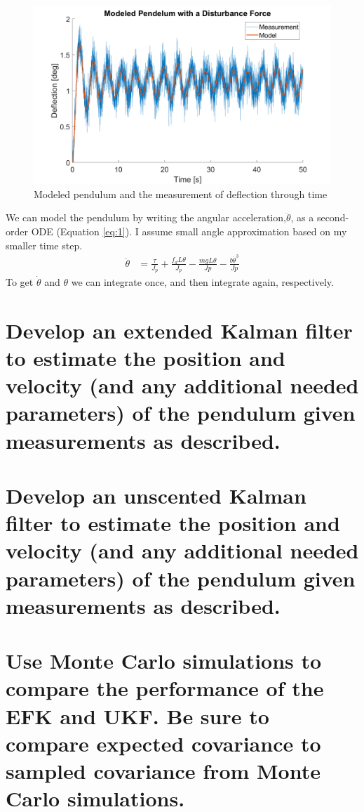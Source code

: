 \documentclass[12pt,letterpaper, onecolumn]{exam}
\begin{document}
\begin{questions}
\begin{parts}
{            \begin{figure}[!h]
                \centering
                \includegraphics[width=0.7\linewidth]{Q1model.png}
                \caption{Modeled pendulum and the measurement of deflection through time}
                \label{fig:1}
            \end{figure}
        }
        We can model the pendulum by writing the angular acceleration,$\ddot{\theta}$, as a second-order ODE (Equation \ref{eq:1}). I assume small angle approximation based on my smaller time step.
        \begin{equation}
            \begin{split}
                \ddot{\theta} & = \frac{\tau}{J_p} + \frac{f_{d}L\theta}{J_p} - \frac{mgL\theta}{Jp} - \frac{b\dot{\theta}^3}{Jp}
            \end{split}
            \label{eq:1}
        \end{equation}
        To get $\dot{\theta}$ and $\theta$ we can integrate once, and then integrate again, respectively.
        \clearpage
        \part{Develop an extended Kalman filter to estimate the position and velocity (and any additional needed parameters) of the pendulum given measurements as described.}

        \part{Develop an unscented Kalman filter to estimate the position and velocity (and any additional needed parameters) of the pendulum given measurements as described.}

        \part{Use Monte Carlo simulations to compare the performance of the EFK and UKF. Be sure to compare expected covariance to sampled covariance from Monte Carlo simulations.}
    \end{parts}


\end{questions}
\end{document}
